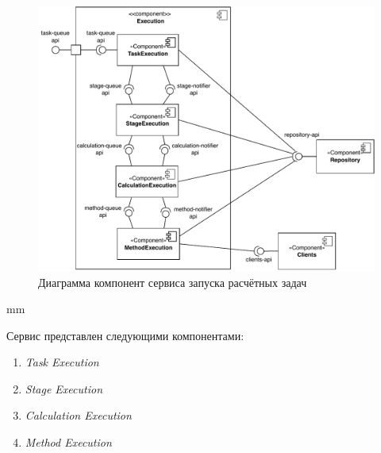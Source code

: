 \begin{figure}[H]
	\hspace*{-2.5 cm}\includegraphics[width=\textwidth]{architecture/pictures/orchestrator/component_detailed}
	\caption{Диаграмма компонент сервиса запуска расчётных задач}
	\label{pic:architecture__orchestrator-detailed-component}
\end{figure}
 mm


Сервис представлен следующими компонентами:
\begin{enumerate}
	\item {
		\textit{Task Execution}
	}
	\item {
		\textit{Stage Execution}
	}
	\item {
		\textit{Calculation Execution}
	}
	\item {
		\textit{Method Execution}
	}
\end{enumerate}
